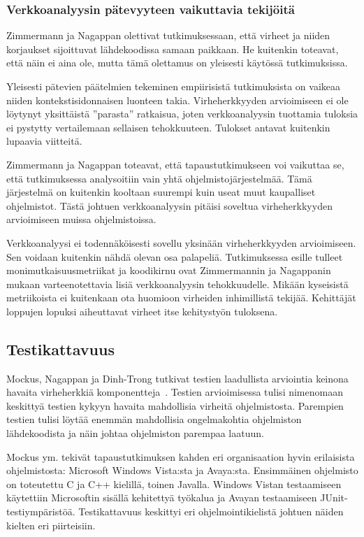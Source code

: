 \documentclass[finnish]{../tktltiki2}
\theoremstyle{definition}
\theoremstyle{remark}
\begin{document}
\subsubsection{Verkkoanalyysin pätevyyteen vaikuttavia tekijöitä}

Zimmermann ja Nagappan olettivat tutkimuksessaan, että virheet ja niiden korjaukset sijoittuvat lähdekoodissa samaan 
paikkaan. He kuitenkin toteavat, että näin ei aina ole, mutta tämä olettamus on yleisesti käytössä tutkimuksissa.

    Yleisesti pätevien päätelmien tekeminen empiirisistä tutkimuksista on vaikeaa niiden kontekstisidonnaisen luonteen 
takia. Virheherkkyyden arvioimiseen ei ole löytynyt yksittäistä ''parasta'' ratkaisua, joten verkkoanalyysin tuottamia 
tuloksia ei pystytty vertailemaan sellaisen tehokkuuteen. Tulokset antavat kuitenkin lupaavia viitteitä.

    Zimmermann ja Nagappan toteavat, että tapaustutkimukseen voi vaikuttaa se, että tutkimuksessa analysoitiin vain yhtä 
ohjelmistojärjestelmää. Tämä järjestelmä on kuitenkin kooltaan suurempi kuin useat muut kaupalliset ohjelmistot. Tästä 
johtuen verkkoanalyysin pitäisi soveltua virheherkkyyden arvioimiseen muissa ohjelmistoissa. 

    Verkkoanalyysi ei todennäköisesti sovellu yksinään virheherkkyyden arvioimiseen. Sen voidaan kuitenkin nähdä olevan 
osa palapeliä. Tutkimuksessa esille tulleet monimutkaisuusmetriikat ja koodikirnu ovat Zimmermannin ja Nagappanin mukaan 
varteenotettavia lisiä verkkoanalyysin tehokkuudelle. Mikään kyseisistä metriikoista ei kuitenkaan ota huomioon 
virheiden inhimillistä tekijää. Kehittäjät loppujen lopuksi aiheuttavat virheet itse kehitystyön tuloksena.

\subsection{Testikattavuus}

Mockus, Nagappan ja Dinh-Trong tutkivat testien laadullista arviointia keinona havaita virheherkkiä 
komponentteja~\cite{MNDT09}. Testien arvioimisessa tulisi nimenomaan keskittyä testien kykyyn havaita mahdollisia 
virheitä ohjelmistosta. Parempien testien tulisi löytää enemmän mahdollisia ongelmakohtia ohjelmiston lähdekoodista ja 
näin johtaa ohjelmiston parempaa laatuun.

    Mockus ym. tekivät tapaustutkimuksen kahden eri organisaation hyvin erilaisista ohjelmistosta: Microsoft Windows 
Vista:sta ja Avaya:sta. Ensimmäinen ohjelmisto on toteutettu C ja C++ kielillä, toinen Javalla. Windows Vistan 
testaamiseen käytettiin Microsoftin sisällä kehitettyä työkalua ja Avayan testaamiseen JUnit-testiympäristöä. 
Testikattavuus keskittyi eri ohjelmointikielistä johtuen näiden kielten eri piirteisiin.
\end{document}
